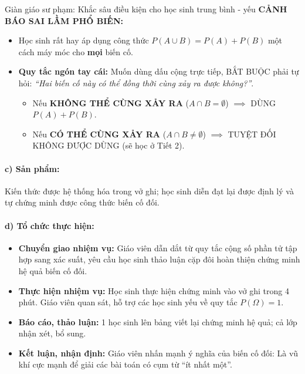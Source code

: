 \documentclass[12pt, a4paper]{article}
\begin{document}
\begin{scaffoldbox}{Giàn giáo sư phạm: Khắc sâu điều kiện cho học sinh trung bình - yếu}
\textbf{CẢNH BÁO SAI LẦM PHỔ BIẾN:}
\begin{itemize}[leftmargin=0.5cm]
    \item Học sinh rất hay áp dụng công thức $P(A \cup B) = P(A) + P(B)$ một cách máy móc cho \textbf{mọi} biến cố.
    \item \textbf{Quy tắc ngón tay cái:} Muốn dùng dấu cộng trực tiếp, BẮT BUỘC phải tự hỏi: \textit{``Hai biến cố này có thể đồng thời cùng xảy ra được không?''}.
    \begin{itemize}[leftmargin=0.4cm]
        \item Nếu \textbf{KHÔNG THỂ CÙNG XẢY RA} ($A \cap B = \emptyset$) $\implies$ DÙNG $P(A) + P(B)$.
        \item Nếu \textbf{CÓ THỂ CÙNG XẢY RA} ($A \cap B \neq \emptyset$) $\implies$ TUYỆT ĐỐI KHÔNG ĐƯỢC DÙNG (sẽ học ở Tiết 2).
    \end{itemize}
\end{itemize}
\end{scaffoldbox}

\paragraph{c) Sản phẩm:} Kiến thức được hệ thống hóa trong vở ghi; học sinh diễn đạt lại được định lý và tự chứng minh được công thức biến cố đối.

\paragraph{d) Tổ chức thực hiện:}
\begin{itemize}[leftmargin=0.8cm]
    \item \textbf{Chuyển giao nhiệm vụ:} Giáo viên dẫn dắt từ quy tắc cộng số phần tử tập hợp sang xác suất, yêu cầu học sinh thảo luận cặp đôi hoàn thiện chứng minh hệ quả biến cố đối.
    \item \textbf{Thực hiện nhiệm vụ:} Học sinh thực hiện chứng minh vào vở ghi trong 4 phút. Giáo viên quan sát, hỗ trợ các học sinh yếu về quy tắc $P(\Omega) = 1$.
    \item \textbf{Báo cáo, thảo luận:} 1 học sinh lên bảng viết lại chứng minh hệ quả; cả lớp nhận xét, bổ sung.
    \item \textbf{Kết luận, nhận định:} Giáo viên nhấn mạnh ý nghĩa của biến cố đối: Là vũ khí cực mạnh để giải các bài toán có cụm từ ``ít nhất một''.
\end{itemize}
\end{document}
